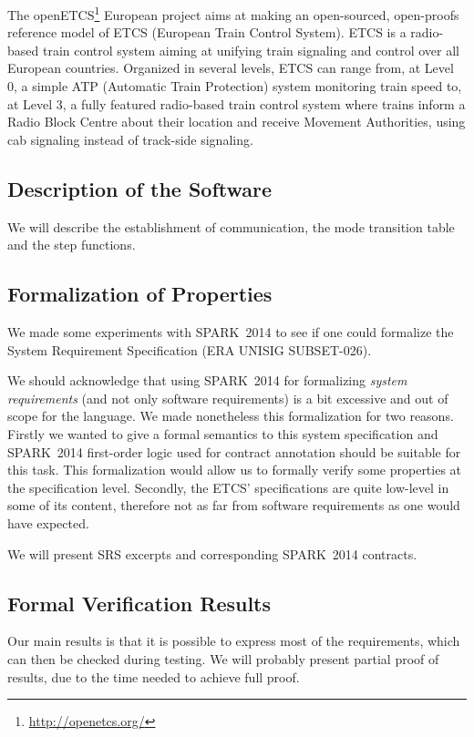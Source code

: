 \documentclass[10pt,a4paper,twocolumn]{article}
\newcommand{\newspark}{SPARK~2014\xspace}
\begin{document}

The openETCS\footnote{\url{http://openetcs.org/}} European project
aims at making an open-sourced, open-proofs reference model of ETCS
(European Train Control System). ETCS is a radio-based train control
system aiming at unifying train signaling and control over all
European countries. Organized in several levels, ETCS can range from,
at Level 0, a simple ATP (Automatic Train Protection) system
monitoring train speed to, at Level 3, a fully featured radio-based
train control system where trains inform a Radio Block Centre about
their location and receive Movement Authorities, using cab signaling
instead of track-side signaling.

\subsection{Description of the Software}

We will describe the establishment of communication, the mode transition table
and the step functions.

\subsection{Formalization of Properties}

We made some experiments with \newspark to see if one could formalize the
System Requirement Specification (ERA UNISIG SUBSET-026).

We should acknowledge that using \newspark for formalizing \emph{system
  requirements} (and not only software requirements) is a bit excessive and out
of scope for the language. We made nonetheless this formalization for two
reasons. Firstly we wanted to give a formal semantics to this system
specification and \newspark first-order logic used for contract annotation
should be suitable for this task. This formalization would allow us to formally
verify some properties at the specification level.  Secondly, the ETCS'
specifications are quite low-level in some of its content, therefore not as far
from software requirements as one would have expected.

We will present SRS excerpts and corresponding \newspark contracts.

\subsection{Formal Verification Results}

Our main results is that it is possible to express most of the requirements,
which can then be checked during testing. We will probably present partial
proof of results, due to the time needed to achieve full proof.
\end{document}
